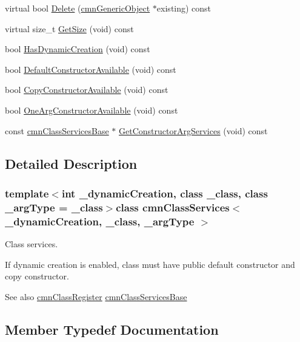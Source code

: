 \begin{DoxyCompactItemize}
\item 
virtual bool \hyperlink{classcmn_class_services_a10d72d0e3a2297bcd586ed0561922c5d}{Delete} (\hyperlink{classcmn_generic_object}{cmn\+Generic\+Object} $\ast$existing) const 
\item 
virtual size\+\_\+t \hyperlink{classcmn_class_services_a2e4ceaf16405914ad22b0c72fb6c95f9}{Get\+Size} (void) const 
\item 
bool \hyperlink{classcmn_class_services_a304746dc35ddd67a55eae55b7472a6ac}{Has\+Dynamic\+Creation} (void) const 
\item 
bool \hyperlink{classcmn_class_services_a6e69303c6c97d888ef062ab2bfd474ad}{Default\+Constructor\+Available} (void) const 
\item 
bool \hyperlink{classcmn_class_services_aa2aec0fe88dc59b2e431d5f0d5e0f564}{Copy\+Constructor\+Available} (void) const 
\item 
bool \hyperlink{classcmn_class_services_a8b0c2ccb060a9ad43981045cb336115f}{One\+Arg\+Constructor\+Available} (void) const 
\item 
const \hyperlink{classcmn_class_services_base}{cmn\+Class\+Services\+Base} $\ast$ \hyperlink{classcmn_class_services_a482b5e3237454e751d3c48c7ec215a24}{Get\+Constructor\+Arg\+Services} (void) const 
\end{DoxyCompactItemize}


\subsection{Detailed Description}
\subsubsection*{template$<$int \+\_\+dynamic\+Creation, class \+\_\+class, class \+\_\+arg\+Type = \+\_\+class$>$class cmn\+Class\+Services$<$ \+\_\+dynamic\+Creation, \+\_\+class, \+\_\+arg\+Type $>$}

Class services. 

If dynamic creation is enabled, class must have public default constructor and copy constructor.

\begin{DoxySeeAlso}{See also}
\hyperlink{classcmn_class_register}{cmn\+Class\+Register} \hyperlink{classcmn_class_services_base}{cmn\+Class\+Services\+Base} 
\end{DoxySeeAlso}


\subsection{Member Typedef Documentation}
\hypertarget{classcmn_class_services_a0c7e37600cf4dfa19bc34abe57cb13ea}{}
